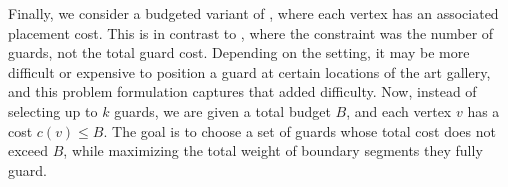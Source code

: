 
Finally, we consider a budgeted variant of \MVVG{}, where each vertex has an associated placement cost. This is in contrast to \MVVG{}, where the constraint was the number of guards, not the total guard cost. Depending on the setting, it may be more difficult or expensive to position a guard at certain locations of the art gallery, and this problem formulation captures that added difficulty. Now, instead of selecting up to $k$ guards, we are given a total budget $B$, and each vertex $v$ has a cost $c(v)\leq B$. The goal is to choose a set of guards whose total cost does not exceed $B$, while maximizing the total weight of boundary segments they fully guard.


